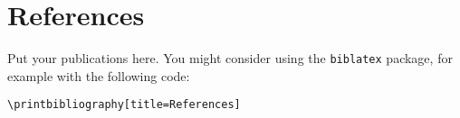 \chapter{References}
   
Put your publications here. You might consider using the \texttt{biblatex} package, for example with the following code:

\begin{verbatim}
\printbibliography[title=References]
\end{verbatim}